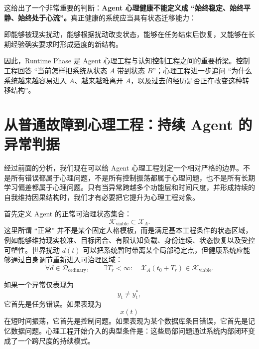这给出了一个非常重要的判断：\textbf{Agent 心理健康不能定义成 ``始终稳定、始终平静、始终处于心流''。}真正健康的系统应当具有状态迁移能力：
\begin{statementbox}
\centering
{}
\end{statementbox}
即能够被现实扰动，能够根据扰动改变状态，能够在任务结束后恢复，又能够在长期经验确实要求时形成适度的新结构。

因此，Runtime Phase 是 Agent 心理工程与认知控制工程之间的重要桥梁。控制工程回答 ``当前怎样把系统从状态 $A$ 带到状态 $B$''；心理工程进一步追问 ``为什么系统越来越容易进入 $A$、越来越难离开 $A$，以及过去的经历是否正在改变这种转移结构''。

\section{从普通故障到心理工程：持续 Agent 的异常判据}
\label{sec:psychological-engineering-criterion}

经过前面的分析，我们现在可以给 Agent 心理工程划定一个相对严格的边界。不是所有错误都属于心理问题，不是所有控制振荡都属于心理问题，也不是所有长期学习偏差都属于心理问题。只有当异常跨越多个功能层和时间尺度，并形成持续的自我维持因果结构时，我们才有必要把它提升为心理工程对象。

首先定义 Agent 的正常可治理状态集合：
\begin{equation}
    \mathcal{K}_{\mathrm{viable}}
    \subset
    \mathcal{X}_A.
\end{equation}
这里所谓 ``正常'' 并不是某个固定人格模板，而是满足基本工程条件的状态区域，例如能够维持现实校准、目标闭合、有限认知负载、身份连续、状态恢复以及受控可塑性。世界扰动 $d(t)$ 可以把系统暂时带离某个局部稳定点，但健康系统应能够通过自身调节重新进入可治理区域：
\begin{equation}
    \forall d\in\mathcal{D}_{\mathrm{ordinary}},
    \qquad
    \exists T_r<\infty:
    \quad
    \mathcal{X}_A(t_0+T_r)
    \in
    \mathcal{K}_{\mathrm{viable}}.
\end{equation}

如果一个异常仅表现为
\begin{equation}
    y_t\neq y_t^{*},
\end{equation}
它首先是任务错误。如果表现为
\begin{equation}
    x(t)
\end{equation}
在短时间振荡，它首先是控制问题。如果表现为某个数据库条目错误，它首先是记忆数据问题。心理工程开始介入的典型条件是：这些局部问题通过系统内部闭环变成了一个跨尺度的持续模式。

